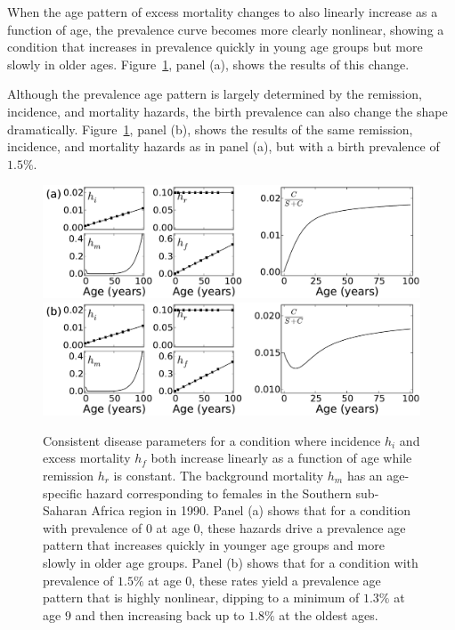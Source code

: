 When the age pattern of excess mortality changes to also linearly
increase as a function of age, the prevalence curve
becomes more clearly nonlinear, showing a condition that increases in
prevalence quickly in young age groups but more slowly in older
ages. Figure~\ref{forward-sim-ex2}, panel (a), shows the results
of this change.

Although the prevalence age pattern is largely determined by the
remission, incidence, and mortality hazards, the birth prevalence can
also change the shape
dramatically. Figure~\ref{forward-sim-ex2}, panel (b),
shows the results of the same remission, incidence, and mortality
hazards as in panel (a), but with a birth prevalence of $1.5\%$.

\begin{figure}[htb]
\begin{center}
\includegraphics[width=\textwidth]{more-excess-mortality.pdf}
\\[.1in]
\includegraphics[width=\textwidth]{birth-prevalence.pdf}
\caption[Consistent disease parameters for a condition with
  excess mortality $h_f$ increasing linearly as a
  function of age.]{Consistent disease parameters for a condition where incidence
  $h_i$ and excess mortality $h_f$ both increase linearly as a
  function of age while remission $h_r$ is constant. The background
  mortality $h_m$ has an age-specific hazard corresponding to females in
  the Southern sub-Saharan Africa region in 1990. Panel (a) shows that for a condition
  with prevalence of $0$ at age $0$, these hazards drive a prevalence
  age pattern that increases quickly in younger age groups and
  more slowly in older age groups. Panel (b) shows that for a condition with prevalence of
  $1.5\%$ at age $0$, these rates yield a prevalence age pattern that is
  highly nonlinear, dipping to a minimum of $1.3\%$ at age $9$ and then
  increasing back up to $1.8\%$ at the oldest ages.
}
\label{forward-sim-ex2}
\end{center}
\end{figure}



